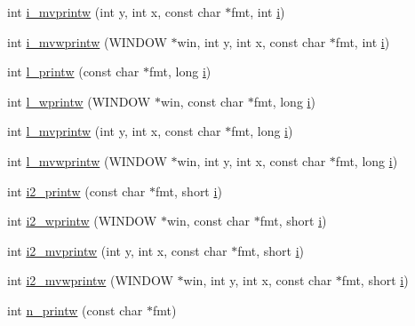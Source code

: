 \begin{DoxyCompactItemize}
\item 
int \hyperlink{C-macros_8c_aeb5fc07bdb9b6670a11c4d74fd32ccf8}{i\+\_\+mvprintw} (int y, int x, const char $\ast$fmt, int \hyperlink{intro__blas1_83_8txt_a8ba82a50c0c2c12d5f6a77f7e4651c0b}{i})
\item 
int \hyperlink{C-macros_8c_a67cef3b1074a38caaa2f8db9b2f953b5}{i\+\_\+mvwprintw} (W\+I\+N\+D\+OW $\ast$win, int y, int x, const char $\ast$fmt, int \hyperlink{intro__blas1_83_8txt_a8ba82a50c0c2c12d5f6a77f7e4651c0b}{i})
\item 
int \hyperlink{C-macros_8c_a438f19725af6b5016916144895acf478}{l\+\_\+printw} (const char $\ast$fmt, long \hyperlink{intro__blas1_83_8txt_a8ba82a50c0c2c12d5f6a77f7e4651c0b}{i})
\item 
int \hyperlink{C-macros_8c_af6c94cd0fe4d153ee0b562bc2140c84a}{l\+\_\+wprintw} (W\+I\+N\+D\+OW $\ast$win, const char $\ast$fmt, long \hyperlink{intro__blas1_83_8txt_a8ba82a50c0c2c12d5f6a77f7e4651c0b}{i})
\item 
int \hyperlink{C-macros_8c_a958fd7e4d13c3ae6f4a8c249309d6b10}{l\+\_\+mvprintw} (int y, int x, const char $\ast$fmt, long \hyperlink{intro__blas1_83_8txt_a8ba82a50c0c2c12d5f6a77f7e4651c0b}{i})
\item 
int \hyperlink{C-macros_8c_a5daab34ebd2f1b9e9c30e70f68b9f634}{l\+\_\+mvwprintw} (W\+I\+N\+D\+OW $\ast$win, int y, int x, const char $\ast$fmt, long \hyperlink{intro__blas1_83_8txt_a8ba82a50c0c2c12d5f6a77f7e4651c0b}{i})
\item 
int \hyperlink{C-macros_8c_af9bd28267a2b2f23bc7f8e1a3c9a88f7}{i2\+\_\+printw} (const char $\ast$fmt, short \hyperlink{intro__blas1_83_8txt_a8ba82a50c0c2c12d5f6a77f7e4651c0b}{i})
\item 
int \hyperlink{C-macros_8c_acc4cfd26a85fbdf72a2f2f70c54aff7e}{i2\+\_\+wprintw} (W\+I\+N\+D\+OW $\ast$win, const char $\ast$fmt, short \hyperlink{intro__blas1_83_8txt_a8ba82a50c0c2c12d5f6a77f7e4651c0b}{i})
\item 
int \hyperlink{C-macros_8c_a32e22b11dad68fa76c882dc89f0997f1}{i2\+\_\+mvprintw} (int y, int x, const char $\ast$fmt, short \hyperlink{intro__blas1_83_8txt_a8ba82a50c0c2c12d5f6a77f7e4651c0b}{i})
\item 
int \hyperlink{C-macros_8c_a880d70f3a8db453d86b23072715762cc}{i2\+\_\+mvwprintw} (W\+I\+N\+D\+OW $\ast$win, int y, int x, const char $\ast$fmt, short \hyperlink{intro__blas1_83_8txt_a8ba82a50c0c2c12d5f6a77f7e4651c0b}{i})
\item 
int \hyperlink{C-macros_8c_a11be0961dcb0e1af9a31aacb25f54116}{n\+\_\+printw} (const char $\ast$fmt)

\end{DoxyCompactItemize}
